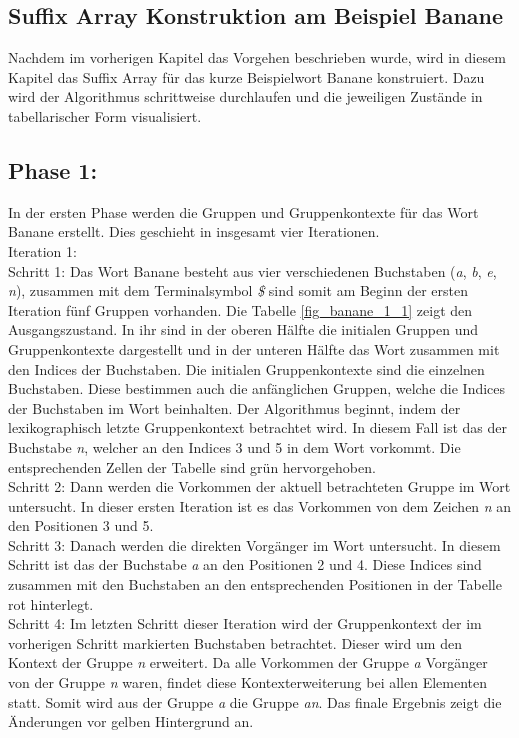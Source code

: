 \newpage
\subsection{Suffix Array Konstruktion am Beispiel Banane}
\label{gsaca:chapter3}
%
Nachdem im vorherigen Kapitel das Vorgehen beschrieben wurde, wird in diesem Kapitel das Suffix Array für das kurze Beispielwort Banane konstruiert.
Dazu wird der Algorithmus schrittweise durchlaufen und die jeweiligen Zustände in tabellarischer Form visualisiert.

\subsection*{Phase 1:}
In der ersten Phase werden die Gruppen und Gruppenkontexte für das Wort Banane erstellt. 
Dies geschieht in insgesamt vier Iterationen.\\

Iteration 1:\\
Schritt 1: Das Wort Banane besteht aus vier verschiedenen Buchstaben (\textit{a}, \textit{b}, \textit{e}, \textit{n}), zusammen mit dem Terminalsymbol \textit{\$} sind somit am Beginn der ersten Iteration fünf Gruppen vorhanden. 
Die Tabelle \ref{fig_banane_1_1} zeigt den Ausgangszustand.
In ihr sind in der oberen Hälfte die initialen Gruppen und Gruppenkontexte dargestellt und in der unteren Hälfte das Wort zusammen mit den Indices der Buchstaben. 
Die initialen Gruppenkontexte sind die einzelnen Buchstaben.
Diese bestimmen auch die anfänglichen Gruppen, welche die Indices der Buchstaben im Wort beinhalten.
Der Algorithmus beginnt, indem der lexikographisch letzte Gruppenkontext betrachtet wird. 
In diesem Fall ist das der Buchstabe \textit{n}, welcher an den Indices 3 und 5 in dem Wort vorkommt. 
Die entsprechenden Zellen der Tabelle sind grün hervorgehoben. \\
Schritt 2: Dann werden die Vorkommen der aktuell betrachteten Gruppe im Wort untersucht. 
In dieser ersten Iteration ist es das Vorkommen von dem Zei\-chen \textit{n} an den Positionen 3 und 5. \\
Schritt 3: Danach werden die direkten Vorgänger im Wort untersucht. 
In diesem Schritt ist das der Buchstabe \textit{a} an den Positionen 2 und 4. 
Diese Indices sind zusammen mit den Buchstaben an den entsprechenden Positionen in der Tabelle rot hinterlegt. \\
Schritt 4: Im letzten Schritt dieser Iteration wird der Gruppenkontext der im vorherigen Schritt markierten Buchstaben betrachtet.
Dieser wird um den Kontext der Gruppe \textit{n} erweitert. 
Da alle Vorkommen der Gruppe \textit{a} Vorgänger von der Gruppe \textit{n} waren, findet diese Kontexterweiterung bei allen Elementen statt. 
Somit wird aus der Gruppe \textit{a} die Gruppe \textit{an}. Das finale Ergebnis zeigt die Änderungen vor gelben Hintergrund an.\\

